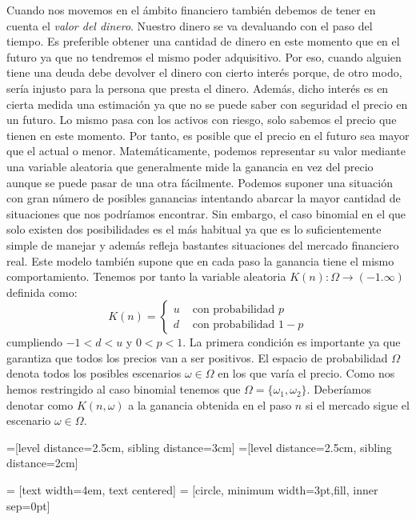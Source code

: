 Cuando nos movemos en el ámbito financiero también debemos de tener en cuenta el \textit{valor del dinero}. Nuestro dinero se va devaluando con el paso del tiempo. Es preferible obtener una cantidad de dinero en este momento que en el futuro ya que no tendremos el mismo poder adquisitivo. Por eso, cuando alguien tiene una deuda debe devolver el dinero con cierto interés porque, de otro modo, sería injusto para la persona que presta el dinero. Además, dicho interés es en cierta medida una estimación ya que no se puede saber con seguridad el precio en un futuro. Lo mismo pasa con los activos con riesgo, solo sabemos el precio que tienen en este momento. Por tanto, es posible que el precio en el futuro sea mayor que el actual o menor. Matemáticamente, podemos representar su valor mediante una variable aleatoria que generalmente mide la ganancia en vez del precio aunque se puede pasar de una otra fácilmente. Podemos suponer una situación con gran número de posibles ganancias intentando abarcar la mayor cantidad de situaciones que nos podríamos encontrar. Sin embargo, el caso binomial en el que solo existen dos posibilidades es el más habitual ya que es lo suficientemente simple de manejar y además refleja bastantes situaciones del mercado financiero real. Este modelo también supone que en cada paso la ganancia tiene el mismo comportamiento.  Tenemos por tanto la variable aleatoria $ K(n):\Omega \longrightarrow (-1.\infty) $ definida como:
\[
K(n) = \begin{cases}
 u & \text{ con probabilidad } p\\
 d & \text{ con probabilidad } 1-p
\end{cases}
\]
cumpliendo $ -1 < d < u $ y $ 0 < p <1 $. La primera condición es importante ya que garantiza que todos los precios van a ser positivos. El espacio de probabilidad $ \Omega $ denota todos los posibles escenarios $ \omega \in \Omega $ en los que varía el precio. Como nos hemos restringido al caso binomial tenemos que $ \Omega = \{ \omega_1, \omega_2\} $. Deberíamos denotar como $ K(n,\omega) $ a la ganancia obtenida en el paso $ n $ si el mercado sigue el escenario $ \omega \in \Omega $.

=[level distance=2.5cm, sibling distance=3cm]
=[level distance=2.5cm, sibling distance=2cm]

 = [text width=4em, text centered]
 = [circle, minimum width=3pt,fill, inner sep=0pt]

